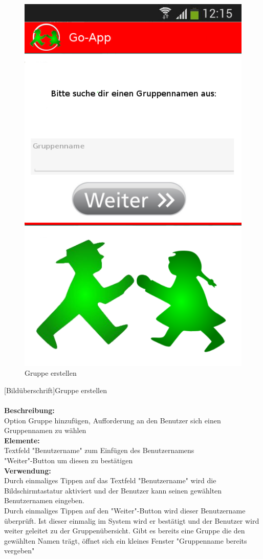 \begin{figure}[H]
	\caption{Gruppe erstellen}
	\includegraphics[scale =0.5]{resources/images/gruppe_erstellen.png}
\end{figure}
[Bildüberschrift]Gruppe erstellen\\ \\
\textbf{Beschreibung:}\\
Option Gruppe hinzufügen, Aufforderung an den Benutzer sich einen Gruppennamen zu wählen\\
\textbf{Elemente:}\\
Textfeld "Benutzername" zum Einfügen des Benutzernamens\\
"Weiter"-Button um diesen zu bestätigen\\
\textbf{Verwendung:}\\
Durch einmaliges Tippen auf das Textfeld "Benutzername" wird die Bildschirmtastatur aktiviert und der Benutzer kann seinen gewählten Benutzernamen eingeben.\\
Durch einmaliges Tippen auf den "Weiter"-Button wird dieser Benutzername überprüft. Ist dieser einmalig im System wird er bestätigt und der Benutzer wird weiter geleitet zu der Gruppenübersicht. Gibt es bereits eine Gruppe die den gewählten Namen trägt, öffnet sich ein kleines Fenster "Gruppenname bereits vergeben"\\ \\

